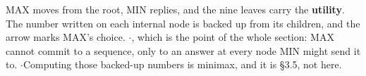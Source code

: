 \vspace{3pt}
{\color{sub}\footnotesize MAX moves from the root, MIN
replies, and the nine leaves carry the \textbf{utility}. The number written on each
internal node is backed up from its children, and the arrow marks MAX's choice.
\gap$\cdot$\gap {}, which is the point of the
whole section: MAX cannot commit to a sequence, only to an answer at every node MIN might
send it to. \gap$\cdot$\gap Computing those backed-up numbers is minimax, and it is
\S3.5, not here.}
